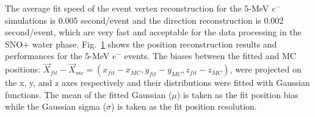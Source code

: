 The average fit speed of the event vertex reconstruction for the 5-MeV $e^-$ simulations is 0.005 second/event and the direction reconstruction is 0.002 second/event, which are very fast and acceptable for the data processing in the SNO+ water phase. Fig.~\ref{fig:5MeVbeta_center_water} shows the position reconstruction results and performances for the 5-MeV $e^-$ events. The biases between the fitted and MC positions: $\vec{X}_{fit}-\vec{X}_{mc}=(x_{fit}-x_{MC},y_{fit}-y_{MC},z_{fit}-z_{MC})$, were projected on the x, y, and z axes respectively and their distributions were fitted with Gaussian functions. The mean of the fitted Gaussian ($\mu$) is taken as the fit position bias while the Gaussian sigma ($\sigma$) is taken as the fit position resolution.
\begin{figure}[htbp]
	\centering \label{fig:5MeVbeta_center_water}
\end{figure}
